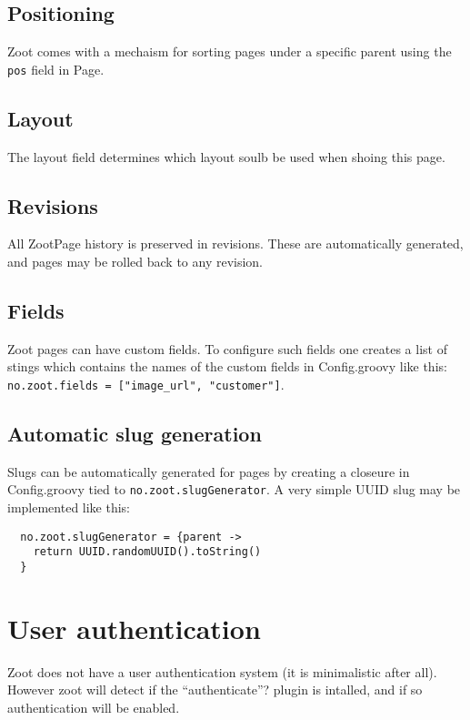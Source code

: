 \documentclass[a4paper,10pt]{article}
\begin{document}
\subsection{Positioning}

Zoot comes with a mechaism for sorting pages under a specific parent using the \texttt{pos} field in Page.

\subsection{Layout}

The layout field determines which layout soulb be used when shoing this page.

\subsection{Revisions}

All ZootPage history is preserved in revisions. These are automatically generated, and pages may be rolled back to any revision.

\subsection{Fields}

Zoot pages can have custom fields. To configure such fields one creates a list of stings which contains the names of the custom fields in Config.groovy like this: \texttt{no.zoot.fields = ["image\_url", "customer"]}.

\subsection{Automatic slug generation}

Slugs can be automatically generated for pages by creating a closeure in Config.groovy tied to \texttt{no.zoot.slugGenerator}. A very simple UUID slug may be implemented like this: 

\begin{lstlisting}
  no.zoot.slugGenerator = {parent ->
    return UUID.randomUUID().toString()
  }
\end{lstlisting}


\section{User authentication}

Zoot does not have a user authentication system (it is minimalistic after all). However zoot will detect if the ``authenticate''? plugin is intalled, and if so authentication will be enabled.
\end{document}
